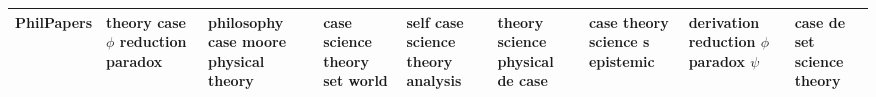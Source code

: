 \documentclass[11pt,a4paper]{article}
\begin{document}
\begin{appendices}
\begin{table*}[htp]
\begin{tiny}
\begin{tabular}{|p{}|p{}|p{}|p{}|p{}|p{}|p{}|p{}|p{}|}
PhilPapers & theory \newline case \newline $\phi$ \newline reduction \newline paradox & philosophy \newline case \newline moore \newline physical \newline theory & case \newline science \newline theory \newline set \newline world & self \newline case \newline science \newline theory \newline analysis & theory \newline science \newline physical \newline de \newline case & case \newline theory \newline science \newline s \newline epistemic & derivation \newline reduction \newline $\phi$ \newline paradox \newline $\psi$ & case \newline de \newline set \newline science \newline theory\\\hline

\end{tabular}
\end{tiny}
\end{table*}
\end{appendices}
\end{document}
